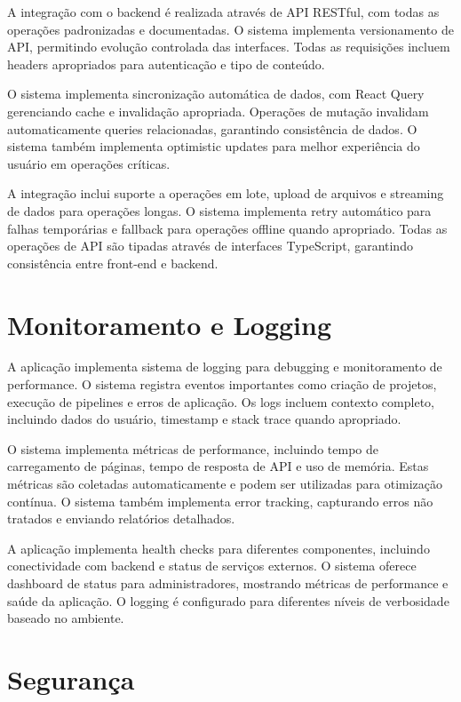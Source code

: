 \documentclass[12pt,a4paper]{article}
\begin{document}
A integração com o backend é realizada através de API RESTful, com todas as operações padronizadas e documentadas. O sistema implementa versionamento de API, permitindo evolução controlada das interfaces. Todas as requisições incluem headers apropriados para autenticação e tipo de conteúdo.

O sistema implementa sincronização automática de dados, com React Query gerenciando cache e invalidação apropriada. Operações de mutação invalidam automaticamente queries relacionadas, garantindo consistência de dados. O sistema também implementa optimistic updates para melhor experiência do usuário em operações críticas.

A integração inclui suporte a operações em lote, upload de arquivos e streaming de dados para operações longas. O sistema implementa retry automático para falhas temporárias e fallback para operações offline quando apropriado. Todas as operações de API são tipadas através de interfaces TypeScript, garantindo consistência entre front-end e backend.

\section{Monitoramento e Logging}

A aplicação implementa sistema de logging para debugging e monitoramento de performance. O sistema registra eventos importantes como criação de projetos, execução de pipelines e erros de aplicação. Os logs incluem contexto completo, incluindo dados do usuário, timestamp e stack trace quando apropriado.

O sistema implementa métricas de performance, incluindo tempo de carregamento de páginas, tempo de resposta de API e uso de memória. Estas métricas são coletadas automaticamente e podem ser utilizadas para otimização contínua. O sistema também implementa error tracking, capturando erros não tratados e enviando relatórios detalhados.

A aplicação implementa health checks para diferentes componentes, incluindo conectividade com backend e status de serviços externos. O sistema oferece dashboard de status para administradores, mostrando métricas de performance e saúde da aplicação. O logging é configurado para diferentes níveis de verbosidade baseado no ambiente.

\section{Segurança}
\end{document}
